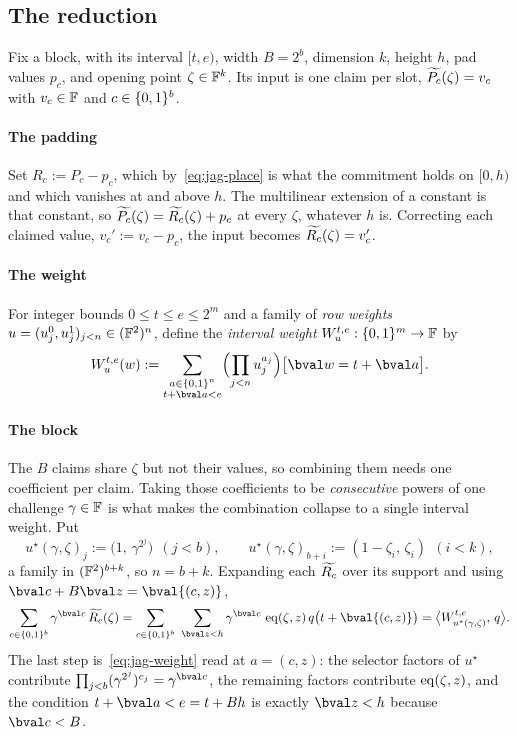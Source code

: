 \subsection{The reduction}\label{jag:reduction}

Fix a block, with its interval $[t,e)$, width $B=2^b$, dimension $k$, height $h$, pad values $p_c$, and opening point $\zeta\in\mathbb{F}^k$. Its input is one claim per slot, $\widetilde{P_c}(\zeta)=v_c$ with $v_c\in\mathbb{F}$ and $c\in\{0,1\}^{b}$.

\paragraph{The padding} Set $R_c:=P_c-p_c$, which by~\eqref{eq:jag-place} is what the commitment holds on $[0,h)$ and which vanishes at and above $h$. The multilinear extension of a constant is that constant, so $\widetilde{P_c}(\zeta)=\widetilde{R_c}(\zeta)+p_c$ at every $\zeta$, whatever $h$ is. Correcting each claimed value, $v_c':=v_c-p_c$, the input becomes $\widetilde{R_c}(\zeta)=v_c'$.

\paragraph{The weight} For integer bounds $0\le t\le e\le2^m$ and a family of \emph{row weights} $u=(u_j^0,u_j^1)_{j<n}\in(\mathbb{F}^2)^n$, define the \emph{interval weight} $W^{t,e}_u:\{0,1\}^{m}\to\mathbb{F}$ by
\begin{equation}
  W^{t,e}_u(w):=\sum_{\substack{a\in\cube n\\ t+\bval a<e}}\Bigl(\prod_{j<n}u_j^{a_j}\Bigr)\bigl[\bval w=t+\bval a\bigr].
  \label{eq:jag-weight}
\end{equation}

\paragraph{The block} The $B$ claims share $\zeta$ but not their values, so combining them needs one coefficient per claim. Taking those coefficients to be \emph{consecutive} powers of one challenge $\gamma\in\mathbb{F}$ is what makes the combination collapse to a single interval weight. Put
\begin{equation}
  u^{\star}(\gamma,\zeta)_j:=\bigl(1,\,\gamma^{2^j}\bigr)\ \ (j<b),\qquad u^{\star}(\gamma,\zeta)_{b+i}:=(1-\zeta_i,\,\zeta_i)\ \ (i<k),
  \label{eq:jag-ustar}
\end{equation}
a family in $(\mathbb{F}^2)^{b+k}$, so $n=b+k$. Expanding each $\widetilde{R_c}$ over its support and using $\bval c+B\bval z=\bval{(c,z)}$,
\begin{equation}
  \sum_{c\in\cube b}\gamma^{\bval c}\,\mle{R_c}(\zeta)
  =\sum_{c\in\cube b}\ \sum_{\bval z<h}\gamma^{\bval c}\,\eq(\zeta,z)\,q\bigl(t+\bval{(c,z)}\bigr)
  =\bigl\langle W^{t,e}_{u^{\star}(\gamma,\zeta)},\,q\bigr\rangle .
  \label{eq:jag-batch}
\end{equation}
The last step is~\eqref{eq:jag-weight} read at $a=(c,z)$: the selector factors of $u^{\star}$ contribute $\prod_{j<b}(\gamma^{2^j})^{c_j}=\gamma^{\bval c}$, the remaining factors contribute $\operatorname{eq}(\zeta,z)$, and the condition $t+\bval a<e=t+Bh$ is exactly $\bval z<h$ because $\bval c<B$.

